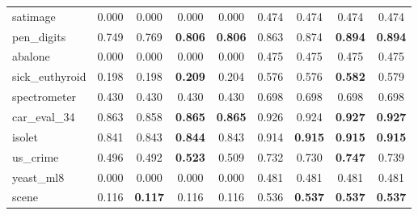 \begin{figure}[ht]
\begin{tabular}{p{22mm}|*4{p{14mm}}|*4{p{14mm}}}
        satimage&\multicolumn{1}{c}{0.000}&\multicolumn{1}{c}{0.000}&\multicolumn{1}{c}{0.000}&\multicolumn{1}{c|}{0.000}&\multicolumn{1}{c}{0.474}&\multicolumn{1}{c}{0.474}&\multicolumn{1}{c}{0.474}&\multicolumn{1}{c}{0.474}\\
        pen\_digits&\multicolumn{1}{c}{0.749}&\multicolumn{1}{c}{0.769}&\multicolumn{1}{c}{\textbf{0.806}}&\multicolumn{1}{c|}{\textbf{0.806}}&\multicolumn{1}{c}{0.863}&\multicolumn{1}{c}{0.874}&\multicolumn{1}{c}{\textbf{0.894}}&\multicolumn{1}{c}{\textbf{0.894}}\\
        abalone&\multicolumn{1}{c}{0.000}&\multicolumn{1}{c}{0.000}&\multicolumn{1}{c}{0.000}&\multicolumn{1}{c|}{0.000}&\multicolumn{1}{c}{0.475}&\multicolumn{1}{c}{0.475}&\multicolumn{1}{c}{0.475}&\multicolumn{1}{c}{0.475}\\
        sick\_euthyroid&\multicolumn{1}{c}{0.198}&\multicolumn{1}{c}{0.198}&\multicolumn{1}{c}{\textbf{0.209}}&\multicolumn{1}{c|}{0.204}&\multicolumn{1}{c}{0.576}&\multicolumn{1}{c}{0.576}&\multicolumn{1}{c}{\textbf{0.582}}&\multicolumn{1}{c}{0.579}\\
        spectrometer&\multicolumn{1}{c}{0.430}&\multicolumn{1}{c}{0.430}&\multicolumn{1}{c}{0.430}&\multicolumn{1}{c|}{0.430}&\multicolumn{1}{c}{0.698}&\multicolumn{1}{c}{0.698}&\multicolumn{1}{c}{0.698}&\multicolumn{1}{c}{0.698}\\
        car\_eval\_34&\multicolumn{1}{c}{0.863}&\multicolumn{1}{c}{0.858}&\multicolumn{1}{c}{\textbf{0.865}}&\multicolumn{1}{c|}{\textbf{0.865}}&\multicolumn{1}{c}{0.926}&\multicolumn{1}{c}{0.924}&\multicolumn{1}{c}{\textbf{0.927}}&\multicolumn{1}{c}{\textbf{0.927}}\\
        isolet&\multicolumn{1}{c}{0.841}&\multicolumn{1}{c}{0.843}&\multicolumn{1}{c}{\textbf{0.844}}&\multicolumn{1}{c|}{0.843}&\multicolumn{1}{c}{0.914}&\multicolumn{1}{c}{\textbf{0.915}}&\multicolumn{1}{c}{\textbf{0.915}}&\multicolumn{1}{c}{\textbf{0.915}}\\
        us\_crime&\multicolumn{1}{c}{0.496}&\multicolumn{1}{c}{0.492}&\multicolumn{1}{c}{\textbf{0.523}}&\multicolumn{1}{c|}{0.509}&\multicolumn{1}{c}{0.732}&\multicolumn{1}{c}{0.730}&\multicolumn{1}{c}{\textbf{0.747}}&\multicolumn{1}{c}{0.739}\\
        yeast\_ml8&\multicolumn{1}{c}{0.000}&\multicolumn{1}{c}{0.000}&\multicolumn{1}{c}{0.000}&\multicolumn{1}{c|}{0.000}&\multicolumn{1}{c}{0.481}&\multicolumn{1}{c}{0.481}&\multicolumn{1}{c}{0.481}&\multicolumn{1}{c}{0.481}\\
        scene&\multicolumn{1}{c}{0.116}&\multicolumn{1}{c}{\textbf{0.117}}&\multicolumn{1}{c}{0.116}&\multicolumn{1}{c|}{0.116}&\multicolumn{1}{c}{0.536}&\multicolumn{1}{c}{\textbf{0.537}}&\multicolumn{1}{c}{\textbf{0.537}}&\multicolumn{1}{c}{\textbf{0.537}}\\

\end{tabular}
\end{figure}
